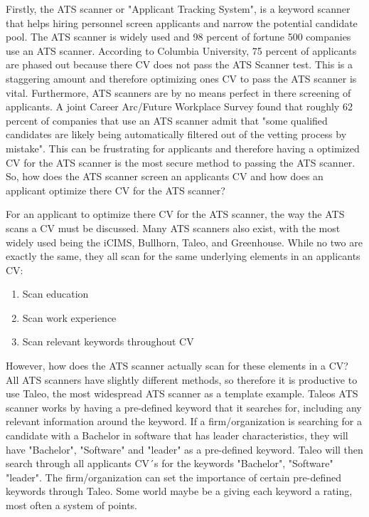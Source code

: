 Firstly, the ATS scanner or "Applicant Tracking System", is a keyword scanner that helps hiring personnel screen applicants and narrow the potential candidate pool.
The ATS scanner is widely used and 98 percent of fortune 500 companies use an ATS scanner.
According to Columbia University, 75 percent of applicants are phased out because there CV does not pass the ATS Scanner test.
This is a staggering amount and therefore optimizing ones CV to pass the ATS scanner is vital.
Furthermore, ATS scanners are by no means perfect in there screening of applicants.
A joint Career Arc/Future Workplace Survey found that roughly 62 percent of companies that use an ATS scanner admit that "some qualified candidates are likely being automatically filtered out of the vetting process by mistake".
This can be frustrating for applicants and therefore having a optimized CV for the ATS scanner is the most secure method to passing the ATS scanner.
So, how does the ATS scanner screen an applicants CV and how does an applicant optimize there CV for the ATS scanner?

For an applicant to optimize there CV for the ATS scanner, the way the ATS scans a CV must be discussed.
Many ATS scanners also exist, with the most widely used being the iCIMS, Bullhorn, Taleo, and Greenhouse.
While no two are exactly the same, they all scan for the same underlying elements in an applicants CV:
\begin{enumerate}
   \item Scan education
   \item Scan work experience
   \item Scan relevant keywords throughout CV
\end{enumerate}
However, how does the ATS scanner actually scan for these elements in a CV?
All ATS scanners have slightly different methods, so therefore it is productive to use Taleo, the most widespread ATS scanner as a template example.
Taleos ATS scanner works by having a pre-defined keyword that it searches for, including any relevant information around the keyword.
If a firm/organization is searching for a candidate with a Bachelor in software that has leader characteristics, they will have "Bachelor", "Software" and "leader" as a pre-defined keyword.
Taleo will then search through all applicants CV´s for the keywords "Bachelor", "Software" "leader".
The firm/organization can set the importance of certain pre-defined keywords through Taleo.
Some world maybe be a 
 giving each keyword a rating, most often a system of points.


